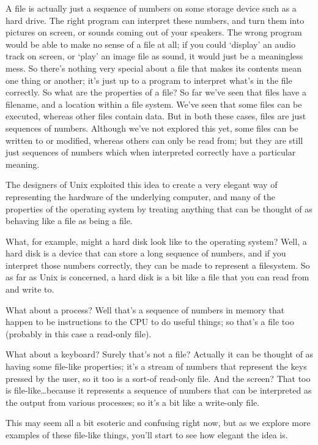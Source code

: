 A file is actually just a sequence of numbers on some storage device such as a hard drive. The right program can interpret these numbers, and turn them into pictures on screen, or sounds coming out of your speakers. The wrong program would be able to make no sense of a file at all; if you could `display' an audio track on screen, or `play' an image file as sound, it would just be a meaningless mess. So there's nothing very special about a file that makes its contents mean one thing or another; it's just up to a program to interpret what's in the file correctly. So what are the properties of a file? So far we've seen that files have a filename, and a location within a file system. We've seen that some files can be executed, whereas other files contain data. But in both these cases, files are just sequences of numbers. Although we've not explored this yet, some files can be written to or modified, whereas others can only be read from; but they are still just sequences of numbers which when interpreted correctly have a particular meaning.

The designers of Unix exploited this idea to create a very elegant way of representing the hardware of the underlying computer, and many of the properties of the operating system by treating anything that can be thought of as behaving like a file as being a file.

What, for example, might a hard disk look like to the operating system? Well, a hard disk is a device that can store a long sequence of numbers, and if you interpret those numbers correctly, they can be made to represent a filesystem. So as far as Unix is concerned, a hard disk is a bit like a file that you can read from and write to.

What about a process? Well that's a sequence of numbers in memory that happen to be instructions to the CPU to do useful things; so that's a file too (probably in this case a read-only file).

What about a keyboard? Surely that's not a file? Actually it can be thought of as having some file-like properties; it's a stream of numbers that represent the keys pressed by the user, so it too is a sort-of read-only file. And the screen? That too is file-like\ldots because it represents a sequence of numbers that can be interpreted as the output from various processes; so it's a bit like a write-only file.

This may seem all a bit esoteric and confusing right now, but as we explore more examples of these file-like things, you'll start to see how elegant the idea is.

